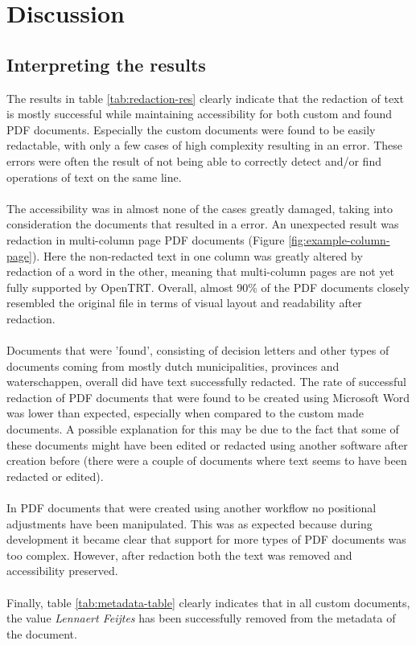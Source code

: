 \chapter{Discussion}

\section{Interpreting the results}
The results in table \ref{tab:redaction-res} clearly indicate that the redaction of text is mostly successful while maintaining accessibility for both custom and found PDF documents. Especially the custom documents were found to be easily redactable, with only a few cases of high complexity resulting in an error. These errors were often the result of not being able to correctly detect and/or find operations of text on the same line.  
\\\\
The accessibility was in almost none of the cases greatly damaged, taking into consideration the documents that resulted in a error. An unexpected result was redaction in multi-column page PDF documents (Figure \ref{fig:example-column-page}). Here the non-redacted text in one column was greatly altered by redaction of a word in the other, meaning that multi-column pages are not yet fully supported by OpenTRT. Overall, almost 90\% of the PDF documents closely resembled the original file in terms of visual layout and readability after redaction.
\\\\
Documents that were 'found', consisting of decision letters and other types of documents coming from mostly dutch municipalities, provinces and waterschappen, overall did have text successfully redacted. The rate of successful redaction of PDF documents that were found to be created using Microsoft Word was lower than expected, especially when compared to the custom made documents. A possible explanation for this may be due to the fact that some of these documents might have been edited or redacted using another software after creation before (there were a couple of documents where text seems to have been redacted or edited).
\\\\
In PDF documents that were created using another workflow no positional adjustments have been manipulated. This was as expected because during development it became clear that support for more types of PDF documents was too complex. However, after redaction both the text was removed and accessibility preserved. 
\\\\
Finally, table \ref{tab:metadata-table} clearly indicates that in all custom documents, the value \textit{Lennaert Feijtes} has been successfully removed from the metadata of the document. 


